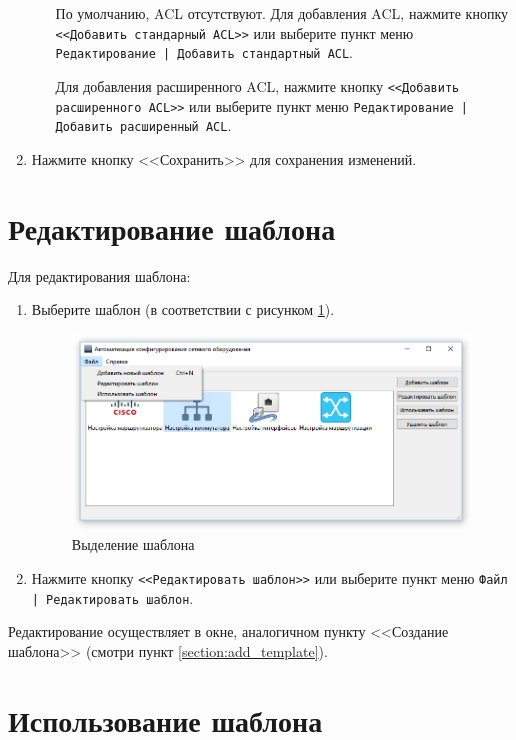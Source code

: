 \begin{enumerate}
\begin{enumerate}
По умолчанию, ACL отсутствуют. Для добавления ACL, нажмите кнопку \texttt{<<Добавить стандарный ACL>>} или выберите пункт меню \texttt{Редактирование | Добавить стандартный ACL}. 

Для добавления расширенного ACL, нажмите кнопку \texttt{<<Добавить расширенного ACL>>} или выберите пункт меню \texttt{Редактирование | Добавить расширенный ACL}. 
\end{enumerate}

\item Нажмите кнопку <<Сохранить>> для сохранения изменений.

\end{enumerate}

\section{Редактирование шаблона}

Для редактирования шаблона:
\begin{enumerate}
	\item Выберите шаблон (в соответствии с рисунком \ref{fig:edit_template}).
	
	
\begin{figure}[th!]
\centering
\includegraphics[width=1\linewidth]{pic/edit_template}
\caption{Выделение шаблона}
\label{fig:edit_template}
\end{figure}

	\item Нажмите кнопку \texttt{<<Редактировать шаблон>>} или выберите пункт меню \texttt{Файл | Редактировать шаблон}.
\end{enumerate}
Редактирование осуществляет в окне, аналогичном пункту <<Создание шаблона>> (смотри пункт \ref{section:add_template}).

\section{Использование шаблона}

